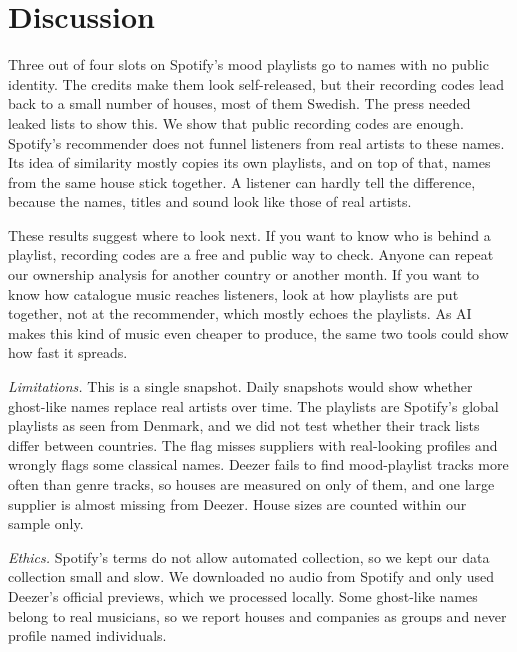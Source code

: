 \documentclass[9pt,twocolumn,twoside]{pnas-new}
\begin{document}
\section*{Discussion}
Three out of four slots on Spotify's mood playlists go to names with no public identity. The credits make them look self-released, but their recording codes lead back to a small number of houses, most of them Swedish. The press needed leaked lists to show this. We show that public recording codes are enough. Spotify's recommender does not funnel listeners from real artists to these names. Its idea of similarity mostly copies its own playlists, and on top of that, names from the same house stick together. A listener can hardly tell the difference, because the names, titles and sound look like those of real artists.

These results suggest where to look next. If you want to know who is behind a playlist, recording codes are a free and public way to check. Anyone can repeat our ownership analysis for another country or another month. If you want to know how catalogue music reaches listeners, look at how playlists are put together, not at the recommender, which mostly echoes the playlists. As AI makes this kind of music even cheaper to produce, the same two tools could show how fast it spreads.

\emph{Limitations.} This is a single snapshot. Daily snapshots would show whether ghost-like names replace real artists over time. The playlists are Spotify's global playlists as seen from Denmark, and we did not test whether their track lists differ between countries. The flag misses suppliers with real-looking profiles and wrongly flags some classical names. Deezer fails to find mood-playlist tracks more often than genre tracks, so houses are measured on only \deezerMatchF{} of them, and one large supplier is almost missing from Deezer. House sizes are counted within our sample only.

\emph{Ethics.} Spotify's terms do not allow automated collection, so we kept our data collection small and slow. We downloaded no audio from Spotify and only used Deezer's official previews, which we processed locally. Some ghost-like names belong to real musicians, so we report houses and companies as groups and never profile named individuals.
\end{document}
